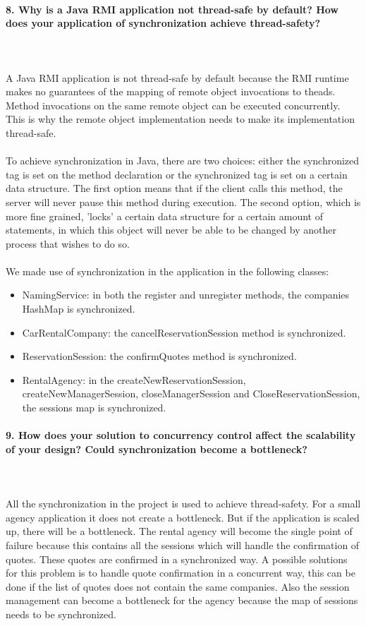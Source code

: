 \documentclass{ds-report}
\begin{document}
	\paragraph{8. Why is a Java RMI application not thread-safe by default? How does your application of synchronization achieve thread-safety?} \mbox{}\\\\
A Java RMI application is not thread-safe by default because the RMI runtime makes no guarantees of the mapping of remote object invocations to theads. Method invocations on the same remote object can be executed concurrently. This is why the remote object implementation needs to make its implementation thread-safe.\\\\
To achieve synchronization in Java, there are two choices: either the synchronized tag is set on the method declaration or the synchronized tag is set on a certain data structure. The first option means that if the client calls this method, the server will never pause this method during execution. The second option, which is more fine grained, 'locks' a certain data structure for a certain amount of statements, in which this object will never be able to be changed by another process that wishes to do so.\\\\
We made use of synchronization in the application in the following classes:
\begin{itemize}
	\item NamingService: in both the register and unregister methods, the companies HashMap is synchronized. 
	\item CarRentalCompany: the cancelReservationSession method is synchronized.
	\item ReservationSession: the confirmQuotes method is synchronized.
	\item RentalAgency: in the createNewReservationSession, createNewManagerSession, closeManagerSession and CloseReservationSession, the sessions map is synchronized.
\end{itemize} 


	\paragraph{9. How does your solution to concurrency control affect the scalability of your design? Could synchronization become a bottleneck?} \mbox{}\\\\
All the synchronization in the project is used to achieve thread-safety. For a small agency application it does not create a bottleneck. But if the application is scaled up, there will be a bottleneck. The rental agency will become the single point of failure because this contains all the sessions which will handle the confirmation of quotes. These quotes are confirmed in a synchronized way. A possible solutions for this problem is to handle quote confirmation in a concurrent way, this can be done if the list of quotes does not contain the same companies. Also the session management can become a bottleneck for the agency because the map of sessions needs to be synchronized.
\end{document}
